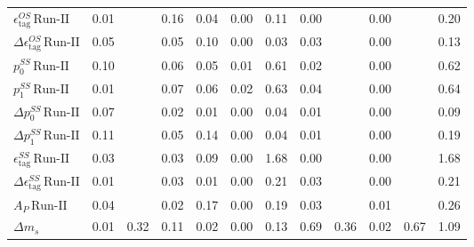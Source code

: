 \begin{tabular}{l  c  c  c  c  c  c  c  c  c  c  | c }
$\epsilon_{\text{tag}}^{OS} \, \text{Run-II}$ & 0.01 &  & 0.16 & 0.04 & 0.00 & 0.11 & 0.00 &  & 0.00 &  & 0.20 \\ 
$\Delta \epsilon_{\text{tag}}^{OS} \, \text{Run-II}$ & 0.05 &  & 0.05 & 0.10 & 0.00 & 0.03 & 0.03 &  & 0.00 &  & 0.13 \\ 
$p_{0}^{SS} \, \text{Run-II}$ & 0.10 &  & 0.06 & 0.05 & 0.01 & 0.61 & 0.02 &  & 0.00 &  & 0.62 \\ 
$p_{1}^{SS} \, \text{Run-II}$ & 0.01 &  & 0.07 & 0.06 & 0.02 & 0.63 & 0.04 &  & 0.00 &  & 0.64 \\ 
$\Delta p_{0}^{SS} \, \text{Run-II}$ & 0.07 &  & 0.02 & 0.01 & 0.00 & 0.04 & 0.01 &  & 0.00 &  & 0.09 \\ 
$\Delta p_{1}^{SS} \, \text{Run-II}$ & 0.11 &  & 0.05 & 0.14 & 0.00 & 0.04 & 0.01 &  & 0.00 &  & 0.19 \\ 
$\epsilon_{\text{tag}}^{SS} \, \text{Run-II}$ & 0.03 &  & 0.03 & 0.09 & 0.00 & 1.68 & 0.00 &  & 0.00 &  & 1.68 \\ 
$\Delta \epsilon_{\text{tag}}^{SS} \, \text{Run-II}$ & 0.01 &  & 0.03 & 0.01 & 0.00 & 0.21 & 0.03 &  & 0.00 &  & 0.21 \\ 
$A_{P} \, \text{Run-II}$ & 0.04 &  & 0.02 & 0.17 & 0.00 & 0.19 & 0.03 &  & 0.01 &  & 0.26 \\ 
$\Delta m_{s}$ & 0.01 & 0.32 & 0.11 & 0.02 & 0.00 & 0.13 & 0.69 & 0.36 & 0.02 & 0.67 & 1.09 \\ 
\hline
\hline
\end{tabular}
